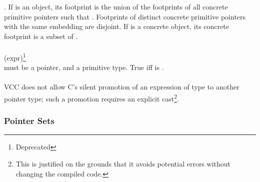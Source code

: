 \documentclass[preprint,nocopyrightspace]{sigplanconf}
\begin{document}
{{\vcc{[\addr(p),\addr(p) + \sizeof_object(p))}.
If  is an object, its footprint is the union of
the footprints of all concrete primitive pointers 
 such that . 
Footprints of distinct concrete primitive pointers with the same
embedding are disjoint.  If  is a concrete object, its concrete
footprint is a subset of 
\vcc{[\addr(p),\addr(p) + \sizeof_object(p))}.
\\\\
 (expr)\footnote{Deprecated}\\
 must be a pointer, and  a primitive type. 
True iff  is .
\\\\
VCC does not allow C's silent promotion of an expression of
type  to another pointer type; such a promotion requires
an explicit cast\footnote{This is justified on the grounds that it avoids
potential errors without changing the compiled code.}.

\subsubsection{Pointer Sets}

}}
\end{document}

